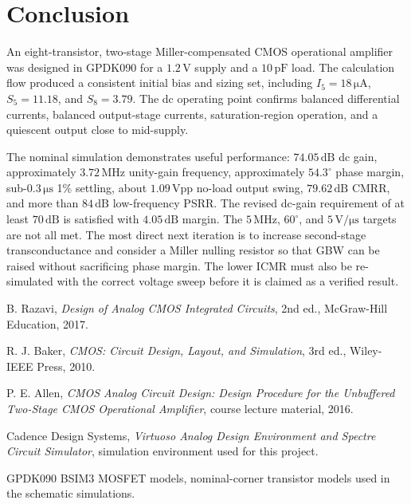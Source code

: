 \documentclass[11pt,a4paper]{report}
\newcommand{\micro}{\mu}
\newcommand{\SI}[2]{\ensuremath{#1\,\mathrm{#2}}}
\newcommand{\ang}[1]{\ensuremath{#1^{\circ}}}
\begin{document}
\chapter{Conclusion}
An eight-transistor, two-stage Miller-compensated CMOS operational amplifier was designed in GPDK090 for a \SI{1.2}{V} supply and a \SI{10}{pF} load. The calculation flow produced a consistent initial bias and sizing set, including $I_5=\SI{18}{\micro A}$, $S_5=11.18$, and $S_8=3.79$. The dc operating point confirms balanced differential currents, balanced output-stage currents, saturation-region operation, and a quiescent output close to mid-supply.

The nominal simulation demonstrates useful performance: \SI{74.05}{dB} dc gain, approximately \SI{3.72}{MHz} unity-gain frequency, approximately \ang{54.3} phase margin, sub-\SI{0.3}{\micro s} 1\% settling, about \SI{1.09}{Vpp} no-load output swing, \SI{79.62}{dB} CMRR, and more than \SI{84}{dB} low-frequency PSRR. The revised dc-gain requirement of at least \SI{70}{dB} is satisfied with \SI{4.05}{dB} margin. The \SI{5}{MHz}, \ang{60}, and \SI{5}{V/\micro s} targets are not all met. The most direct next iteration is to increase second-stage transconductance and consider a Miller nulling resistor so that GBW can be raised without sacrificing phase margin. The lower ICMR must also be re-simulated with the correct voltage sweep before it is claimed as a verified result.

\begin{thebibliography}{9}
B. Razavi, \emph{Design of Analog CMOS Integrated Circuits}, 2nd ed., McGraw-Hill Education, 2017.

R. J. Baker, \emph{CMOS: Circuit Design, Layout, and Simulation}, 3rd ed., Wiley-IEEE Press, 2010.

P. E. Allen, \emph{CMOS Analog Circuit Design: Design Procedure for the Unbuffered Two-Stage CMOS Operational Amplifier}, course lecture material, 2016.

Cadence Design Systems, \emph{Virtuoso Analog Design Environment and Spectre Circuit Simulator}, simulation environment used for this project.

GPDK090 BSIM3 MOSFET models, nominal-corner transistor models used in the schematic simulations.
\end{thebibliography}

\appendix
\end{document}
